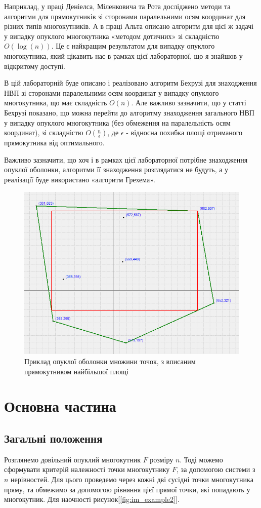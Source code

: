 \documentclass[a4paper,12pt]{article}
\begin{document}
		Наприклад, у праці Деніелса, Міленковича та Рота \cite{example2} досліджено методи та алгоритми для прямокутників зі сторонами паралельними осям координат для різних типів многокутників. А в праці Альта \cite{example3} описано алгоритм для цієї ж задачі у випадку опуклого многокутника «методом дотичних» зі складністю $O(\log(n))$. Це є найкращим результатом для випадку опуклого многокутника, який цікавить нас в рамках цієї лабораторної, що я знайшов у відкритому доступі.
		
		В цій лабораторній буде описано і реалізовано алгоритм Бехрузі \cite{example1} для знаходження НВП зі сторонами паралельними осям координат у випадку опуклого многокутника, що має складність $O(n)$. Але важливо зазначити, що у статті Бехрузі показано, що можна перейти до алгоритму знаходження загального НВП у випадку опуклого многокутника (без обмеження на паралельність осям координат), зі складністю $O(\frac{n}{\epsilon})$, де $\epsilon$ - відносна похибка площі отриманого прямокутника від оптимального.
		
		Важливо зазначити, що хоч і в рамках цієї лабораторної потрібне знаходження опуклої оболонки, \cite{example4} алгоритми її знаходження розглядатися не будуть, а у реалізації буде використано «алгоритм Грехема».
		\begin{figure}[htbp]
			\centering
			\includegraphics[width=0.6\linewidth]{images/example1}
			\caption{Приклад опуклої оболонки множини точок, з вписаним прямокутником найбільшої площі}
			\label{fig:im_example1}
		\end{figure}
	\newpage
	
	\section{Основна частина}
	\subsection{Загальні положення}
	Розглянемо довільний опуклий многокутник $F$ розміру $n$. Тоді можемо сформувати критерій належності точки многокутнику $F$, за допомогою системи з $n$ нерівностей. Для цього проведемо через кожні дві сусідні точки многокутника пряму, та обмежимо за допомогою рівняння цієї прямої точки, які попадають у многокутник. Для наочності рисунок[\ref{fig:im_example2}].
	
\end{document}
